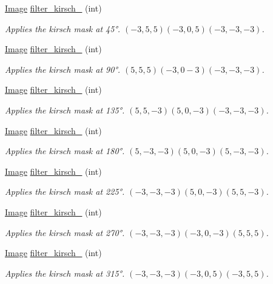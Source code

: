 \begin{DoxyCompactItemize}
\hyperlink{class_image}{Image} \hyperlink{class_image_afc2543445381bf7b7dc07167f5bef42f}{filter\-\_\-kirsch\-\_} (int)
\begin{DoxyCompactList}\small\item\em Applies the kirsch mask at 45°. $(-3,5,5)(-3,0,5)(-3,-3,-3)$. \end{DoxyCompactList}\item 
\hyperlink{class_image}{Image} \hyperlink{class_image_afe3524a312d6860dba3ae9caeb41aaac}{filter\-\_\-kirsch\-\_} (int)
\begin{DoxyCompactList}\small\item\em Applies the kirsch mask at 90°. $(5,5,5)(-3,0-3)(-3,-3,-3)$. \end{DoxyCompactList}\item 
\hyperlink{class_image}{Image} \hyperlink{class_image_a89c324635717b51fce1fdb53eb20ea53}{filter\-\_\-kirsch\-\_} (int)
\begin{DoxyCompactList}\small\item\em Applies the kirsch mask at 135°. $(5,5,-3)(5,0,-3)(-3,-3,-3)$. \end{DoxyCompactList}\item 
\hyperlink{class_image}{Image} \hyperlink{class_image_a2d98fe13c3ad3949e7e5a42e0381dfae}{filter\-\_\-kirsch\-\_} (int)
\begin{DoxyCompactList}\small\item\em Applies the kirsch mask at 180°. $(5,-3,-3)(5,0,-3)(5,-3,-3)$. \end{DoxyCompactList}\item 
\hyperlink{class_image}{Image} \hyperlink{class_image_a3d99f369ce877076d9de45608566e5ab}{filter\-\_\-kirsch\-\_} (int)
\begin{DoxyCompactList}\small\item\em Applies the kirsch mask at 225°. $(-3,-3,-3)(5,0,-3)(5,5,-3)$. \end{DoxyCompactList}\item 
\hyperlink{class_image}{Image} \hyperlink{class_image_a3deff23888dd56ee45c6e2556bb2e407}{filter\-\_\-kirsch\-\_} (int)
\begin{DoxyCompactList}\small\item\em Applies the kirsch mask at 270°. $(-3,-3,-3)(-3,0,-3)(5,5,5)$. \end{DoxyCompactList}\item 
\hyperlink{class_image}{Image} \hyperlink{class_image_afaacfcecb4f65541f06dd2aebc6a8d0c}{filter\-\_\-kirsch\-\_} (int)
\begin{DoxyCompactList}\small\item\em Applies the kirsch mask at 315°. $(-3,-3,-3)(-3,0,5)(-3,5,5)$. \end{DoxyCompactList}\item 

\end{DoxyCompactItemize}
